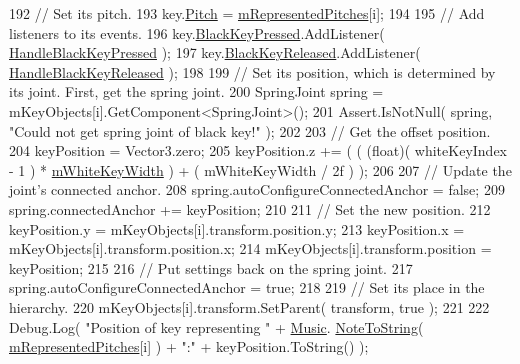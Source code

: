 \begin{DoxyCodeInclude}
192                 \textcolor{comment}{// Set its pitch.}
193                 key.\hyperlink{group___black_key_pub_var_gad233c456182c9cef7c01486484940439}{Pitch} = \hyperlink{group___key_contain_priv_var_ga103945a6efe3469191e5253d13fec5be}{mRepresentedPitches}[i];
194 
195                 \textcolor{comment}{// Add listeners to its events.}
196                 key.\hyperlink{group___black_key_events_ga51f1badf49df0c54e31a20ba4b7abd6b}{BlackKeyPressed}.AddListener( 
      \hyperlink{group___key_contain_handlers_ga05cc2543fd9772b26e27bf4f6247ab47}{HandleBlackKeyPressed} );
197                 key.\hyperlink{group___black_key_events_ga2710bdaba16dbdb82c0d38f11ce642d8}{BlackKeyReleased}.AddListener( 
      \hyperlink{group___key_contain_handlers_ga5a0c5565c5ebc6026b3122f487e51704}{HandleBlackKeyReleased} );
198 
199                 \textcolor{comment}{// Set its position, which is determined by its joint. First, get the spring joint.}
200                 SpringJoint spring = mKeyObjects[i].GetComponent<SpringJoint>();
201                 Assert.IsNotNull( spring, \textcolor{stringliteral}{"Could not get spring joint of black key!"} );
202 
203                 \textcolor{comment}{// Get the offset position.}
204                 keyPosition = Vector3.zero;
205                 keyPosition.z += ( ( (float)( whiteKeyIndex - 1 ) * 
      \hyperlink{group___key_contain_priv_var_gae5b8787a5242834f99ad8072e7ea6004}{mWhiteKeyWidth} ) + ( mWhiteKeyWidth / 2f ) );
206 
207                 \textcolor{comment}{// Update the joint's connected anchor.}
208                 spring.autoConfigureConnectedAnchor = \textcolor{keyword}{false};
209                 spring.connectedAnchor += keyPosition;
210 
211                 \textcolor{comment}{// Set the new position.}
212                 keyPosition.y = mKeyObjects[i].transform.position.y;
213                 keyPosition.x = mKeyObjects[i].transform.position.x;
214                 mKeyObjects[i].transform.position = keyPosition;
215 
216                 \textcolor{comment}{// Put settings back on the spring joint.}
217                 spring.autoConfigureConnectedAnchor = \textcolor{keyword}{true};
218 
219                 \textcolor{comment}{// Set its place in the hierarchy.}
220                 mKeyObjects[i].transform.SetParent( transform, \textcolor{keyword}{true} );
221 
222                 Debug.Log( \textcolor{stringliteral}{"Position of key representing "} + \hyperlink{class_music}{Music}.
      \hyperlink{group___music_stat_func_ga85a22c905d56d4c5f4e62159bfecee8c}{NoteToString}( \hyperlink{group___key_contain_priv_var_ga103945a6efe3469191e5253d13fec5be}{mRepresentedPitches}[i] ) + \textcolor{stringliteral}{":"} + keyPosition.ToString() );

\end{DoxyCodeInclude}
